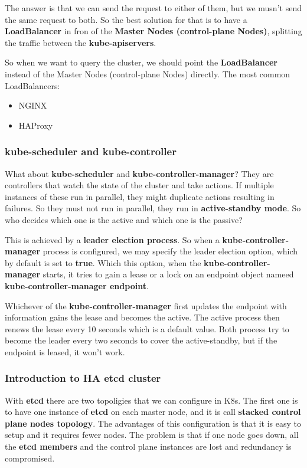 \documentclass{article}
\begin{document}
The answer is that we can send the request to either of them, but we musn't send the same request to both. So the best solution for that is to have a \textbf{LoadBalancer} in fron of the \textbf{Master Nodes (control-plane Nodes)}, splitting the traffic between the \textbf{kube-apiservers}.

So when we want to query the cluster, we should point the \textbf{LoadBalancer} instead of the Master Nodes (control-plane Nodes) directly. The most common LoadBalancers:
\begin{itemize}
    \item NGINX
    \item HAProxy
\end{itemize}

\subsubsection{kube-scheduler and kube-controller}
What about \textbf{kube-scheduler} and \textbf{kube-controller-manager}? They are controllers that watch the state of the cluster and take actions. If multiple instances of these run in parallel,
they might duplicate actions resulting in failures. So they must not run in parallel, they run in \textbf{active-standby mode}. So who decides which one is the active and which one is the passive? 

This is achieved by a \textbf{leader election process}.
So when a \textbf{kube-controller-manager} process is configured, we may specify the leader election option, which by default is set to \textbf{true}. Which this option, when the \textbf{kube-controller-manager} starts, it tries to gain a lease or a lock on an endpoint object
nameed \textbf{kube-controller-manager endpoint}.

Whichever of the \textbf{kube-controller-manager} first updates the endpoint with information gains the lease and becomes the active. The active process then renews the lease every 10 seconds which is a default value. Both process try to become the leader every two seconds to cover the active-standby, but if the endpoint is leased, it won't work.

\subsubsection{Introduction to HA etcd cluster}
With \textbf{etcd} there are two topoligies that we can configure in K8s. The first one is to have one instance of \textbf{etcd} on each master node, and it is call \textbf{stacked control plane nodes topology}. The advantages of this configuration is that it is easy to setup and it requires fewer nodes. The problem is that if one node goes down, all the \textbf{etcd members} and the control plane instances are lost and redundancy is compromised.
\end{document}
